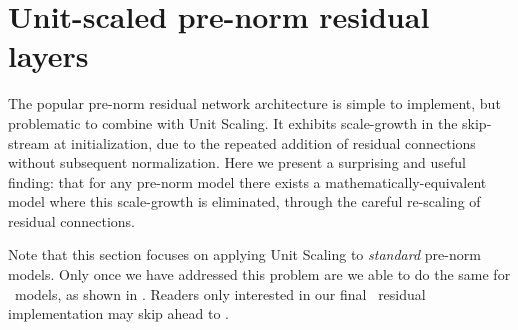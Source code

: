 \section{Unit-scaled pre-norm residual layers}  \label{sec:us_residuals}

The popular pre-norm residual network architecture is simple to implement, but problematic to combine with Unit Scaling. It exhibits scale-growth in the skip-stream at initialization, due to the repeated addition of residual connections without subsequent normalization. Here we present a surprising and useful finding: that for any pre-norm model there exists a mathematically-equivalent model where this scale-growth is eliminated, through the careful re-scaling of residual connections.

Note that this section focuses on applying Unit Scaling to \textit{standard} pre-norm models. Only once we have addressed this problem are we able to do the same for \umup\ models, as shown in . Readers only interested in our final \umup\ residual implementation may skip ahead to .





